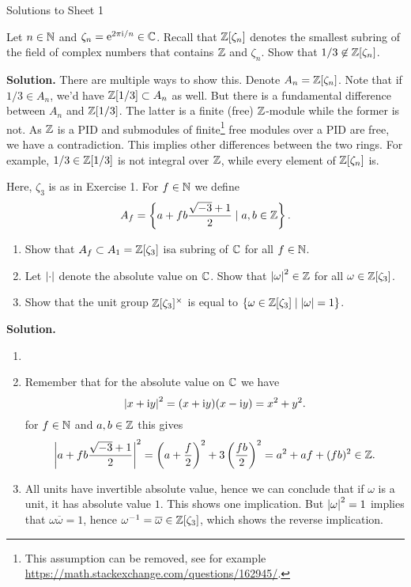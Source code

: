 \documentclass[a4paper,11pt]{article}
\begin{document}
\begin{center}
    \huge{Solutions to Sheet 1}
\end{center}

Let $n \in \mathbb{N}$ and $\zeta_n = \mathrm e^{2 \pi \mathrm i/n} \in \mathbb{C}$. Recall that 
$\mathbb{Z}[\zeta_n]$ denotes the smallest subring of the field of complex numbers
that contains $\mathbb{Z}$ and $\zeta_n$. Show that $1/3 \not \in \mathbb{Z}[\zeta_n]$. 

\textbf{Solution.} There are multiple ways to show this.
Denote $A_n = \mathbb{Z}[\zeta_n]$. Note that if $1/3 \in A_n$, we'd have 
$\mathbb{Z}[1/3] \subset A_n$ as well. But there is a fundamental difference between
$A_n$ and $\mathbb{Z}[1/3]$. The latter is a finite (free) $\mathbb{Z}$-module while the 
former is not. As $\mathbb{Z}$ is a PID and submodules of finite\footnote{This assumption can be removed, see for example \url{https://math.stackexchange.com/questions/162945/}.} free modules over a PID are free, we have a contradiction.
This implies other differences between the two rings. For example,
$1/3 \in \mathbb{Z}[1/3]$ is not integral over $\mathbb{Z}$, while every element of 
$\mathbb{Z}[\zeta_n]$ is.

Here, $\zeta_3$ is as in Exercise 1. For $f \in \mathbb{N}$ we define
\begin{equation*}
    A_f = \left \{ a + fb \frac{\sqrt{-3} + 1}2 \mid a, b \in \mathbb{Z} \right \}.
\end{equation*}
\begin{enumerate}
    \item Show that $A_f \subset A_1 = \mathbb{Z}[\zeta_3]$ isa subring of 
        $\mathbb{C}$ for all $f \in \mathbb{N}$. 
    \item Let $\left\lvert \cdot \right\rvert$ denote the absolute value on $\mathbb{C}$. Show that 
        $\left\lvert \omega \right\rvert^2 \in \mathbb{Z}$ for all $\omega \in \mathbb{Z}[\zeta_3]$. 
    \item Show that the unit group $\mathbb{Z}[\zeta_3]^\times$ is equal to
        $\{\omega \in \mathbb{Z}[\zeta_3] \mid \left\lvert \omega \right\rvert = 1\}$. 
\end{enumerate}
\textbf{Solution.}
\begin{enumerate}
    \item 
    \item Remember that for the absolute value on $\mathbb{C}$ we have
        \begin{equation*}
            \left\lvert x + \mathrm i y \right\rvert^2 = (x + \mathrm i y)(x - \mathrm i y) = x^2 + y^2.
        \end{equation*}
        for $f \in \mathbb{N}$ and $a, b \in \mathbb{Z}$ this gives
        \begin{equation*}
            \left\lvert a + fb \frac{\sqrt{-3}+1}2 \right\rvert^2 = \left (a + \frac f2\right)^2
            + 3\left( \frac {fb}2 \right)^2 = a^2 + af + (fb)^2 \in \mathbb{Z}. 
        \end{equation*}
    \item All units have invertible absolute value, hence we can conclude
        that if $\omega$ is a unit, it has absolute value $1$. This
        shows one implication. But $\left\lvert \omega \right\rvert^2 = 1$  
        implies that $\omega \overline \omega = 1$, hence $\omega^{-1} = 
        \overline \omega \in \mathbb{Z}[\zeta_3]$, which shows the reverse implication.
\end{enumerate}
\end{document}
